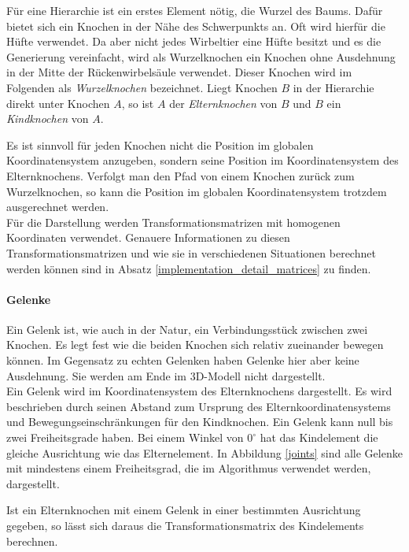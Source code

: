 Für eine Hierarchie ist ein erstes Element nötig, die Wurzel des Baums.
Dafür bietet sich ein Knochen in der Nähe des Schwerpunkts an. Oft wird hierfür die Hüfte verwendet. 
Da aber nicht jedes Wirbeltier eine Hüfte besitzt und es die Generierung vereinfacht, wird als Wurzelknochen ein Knochen ohne Ausdehnung in der Mitte der Rückenwirbelsäule verwendet. Dieser Knochen wird im Folgenden als \emph{Wurzelknochen} bezeichnet. Liegt Knochen $B$ in der Hierarchie direkt unter Knochen $A$, so ist $A$ der \emph{Elternknochen} von $B$ und $B$ ein \emph{Kindknochen} von $A$.

Es ist sinnvoll für jeden Knochen nicht die Position im globalen Koordinatensystem anzugeben, sondern seine Position im Koordinatensystem des Elternknochens. Verfolgt man den Pfad von einem Knochen zurück zum Wurzelknochen, so kann die Position im globalen Koordinatensystem trotzdem ausgerechnet werden.  \\
Für die Darstellung werden Transformationsmatrizen mit homogenen Koordinaten verwendet. Genauere Informationen zu diesen Transformationsmatrizen und wie sie in verschiedenen Situationen berechnet werden können sind in Absatz \ref{implementation_detail_matrices} zu finden.

\paragraph{Gelenke}
Ein Gelenk ist, wie auch in der Natur, ein Verbindungsstück zwischen zwei Knochen. Es legt fest wie die beiden Knochen sich relativ zueinander bewegen können. Im Gegensatz zu echten Gelenken haben Gelenke hier aber keine Ausdehnung. Sie werden am Ende im 3D-Modell nicht dargestellt.\\
Ein Gelenk wird im Koordinatensystem des Elternknochens dargestellt. Es wird beschrieben durch seinen Abstand zum Ursprung des Elternkoordinatensystems und Bewegungseinschränkungen für den Kindknochen. Ein Gelenk kann null bis zwei Freiheitsgrade haben. Bei einem Winkel von $0^\circ$ hat das Kindelement die gleiche Ausrichtung wie das Elternelement. In Abbildung \ref{joints} sind alle Gelenke mit mindestens einem Freiheitsgrad, die im Algorithmus verwendet werden, dargestellt.

Ist ein Elternknochen mit einem Gelenk in einer bestimmten Ausrichtung gegeben, so lässt sich daraus die Transformationsmatrix des Kindelements berechnen.


